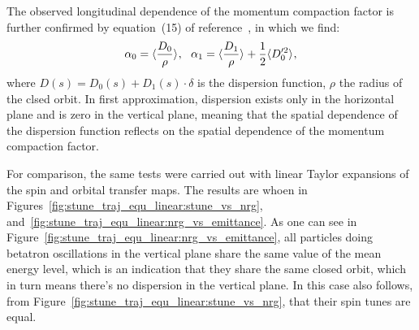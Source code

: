 The observed longitudinal dependence of the momentum compaction factor is further confirmed by equation~(15)
of reference~\cite{Senichev:IPAC13}, in which we find:
\[
\alpha_0 = \avg{\frac{D_0}{\rho}},~~ \alpha_1 = \avg{\frac{D_1}{\rho}} + \frac12\avg{D_0'^2},
\]
where $D(s) = D_0(s) + D_1(s)\cdot \delta$  is the dispersion function, $\rho$ the radius of the clsed orbit.
In first approximation, dispersion exists only in the horizontal plane and is zero in the vertical plane,
meaning that the spatial dependence of the dispersion function reflects on the spatial dependence of the momentum
compaction factor.

For comparison, the same tests were carried out with linear Taylor expansions of the spin and orbital
transfer maps. The results are whoen in Figures~\ref{fig:stune_traj_equ_linear:stune_vs_nrg},
and~\ref{fig:stune_traj_equ_linear:nrg_vs_emittance}. As one can see in
Figure~\ref{fig:stune_traj_equ_linear:nrg_vs_emittance}, all particles doing betatron oscillations in the
vertical plane share the same value of the mean energy level, which is an indication that they share
the same closed orbit, which in turn means there's no dispersion in the vertical plane.
In this case also follows, from Figure~\ref{fig:stune_traj_equ_linear:stune_vs_nrg}, that their spin tunes
are equal.

